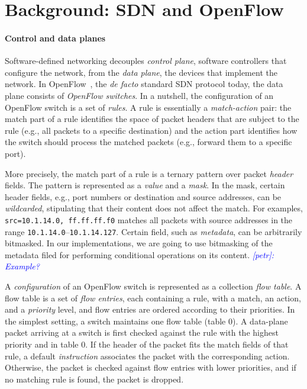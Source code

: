 \documentclass[conference]{sigcomm-alternate}
\newcommand{\liron}[1]{\textit{\textcolor{mygreen}{[liron]: #1}}} %
\newcommand{\petr}[1]{\textit{\textcolor{blue}{[petr]: #1}}} %
\begin{document}
\section{Background: SDN and OpenFlow}\label{sec:background}


\paragraph{Control and data planes}
Software-defined networking decouples \emph{control plane}, software
controllers that configure the network, from the \emph{data plane}, the
devices that implement the network.  
% 
In OpenFlow~\cite{of-spec}, the \emph{de facto} standard SDN protocol
today, the data plane consists of \emph{OpenFlow switches}. 
In a nutshell, the configuration of an OpenFlow switch is a set of
\emph{rules}. 
A rule is essentially a \emph{match-action} pair:
the match part of a rule identifies the space of packet headers that are
subject to the rule (e.g., all packets to a specific destination) and
the action part identifies how the switch should process the matched
packets (e.g., forward them to a specific port).

More precisely, the match part of a rule is 
a ternary pattern over packet \emph{header} fields.
The pattern is represented as a \emph{value} and a \emph{mask}. 
In the mask, certain header fields, e.g., port numbers or destination and source
addresses, can be \emph{wildcarded}, stipulating that their content does
not affect the match. 
For examples, \texttt{src=10.1.14.0, ff.ff.ff.f0} matches all packets
with source addresses in the range \texttt{10.1.14.0}--\texttt{10.1.14.127}.
Certain field, such as \emph{metadata}, can be arbitrarily
bitmasked. 
In our implementations, we are going to use bitmasking of the metadata
filed for performing conditional operations on  its content.   
\petr{Example?}

A \emph{configuration} of an OpenFlow switch is represented as a
collection \emph{flow table}.
A flow table is a set of \emph{flow entries}, each containing a rule,
with a match, an action, and a \emph{priority} level, and flow entries
are ordered according to their priorities.  
In the simplest setting, a switch maintains one flow table (table 0).  
A data-plane packet arriving at a switch is first checked against
the rule with the highest priority and in table $0$. 
If the header of the packet fits the match fields of that rule, 
a default \emph{instruction} associates the packet with the corresponding action.
Otherwise, the packet is checked against flow  entries with lower
priorities, and if no matching rule is found, the packet is dropped.
\end{document}
